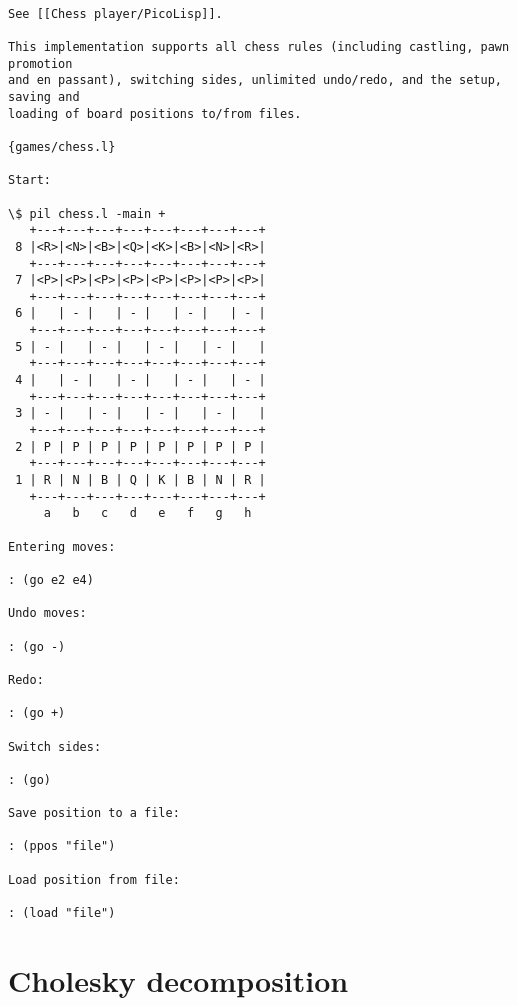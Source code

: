 \begin{verbatim}

See [[Chess player/PicoLisp]].

This implementation supports all chess rules (including castling, pawn promotion
and en passant), switching sides, unlimited undo/redo, and the setup, saving and
loading of board positions to/from files.

{games/chess.l}

Start:

\$ pil chess.l -main +
   +---+---+---+---+---+---+---+---+
 8 |<R>|<N>|<B>|<Q>|<K>|<B>|<N>|<R>|
   +---+---+---+---+---+---+---+---+
 7 |<P>|<P>|<P>|<P>|<P>|<P>|<P>|<P>|
   +---+---+---+---+---+---+---+---+
 6 |   | - |   | - |   | - |   | - |
   +---+---+---+---+---+---+---+---+
 5 | - |   | - |   | - |   | - |   |
   +---+---+---+---+---+---+---+---+
 4 |   | - |   | - |   | - |   | - |
   +---+---+---+---+---+---+---+---+
 3 | - |   | - |   | - |   | - |   |
   +---+---+---+---+---+---+---+---+
 2 | P | P | P | P | P | P | P | P |
   +---+---+---+---+---+---+---+---+
 1 | R | N | B | Q | K | B | N | R |
   +---+---+---+---+---+---+---+---+
     a   b   c   d   e   f   g   h

Entering moves:

: (go e2 e4)

Undo moves:

: (go -)

Redo:

: (go +)

Switch sides:

: (go)

Save position to a file:

: (ppos "file")

Load position from file:

: (load "file")

\end{verbatim}

\section*{Cholesky decomposition}

